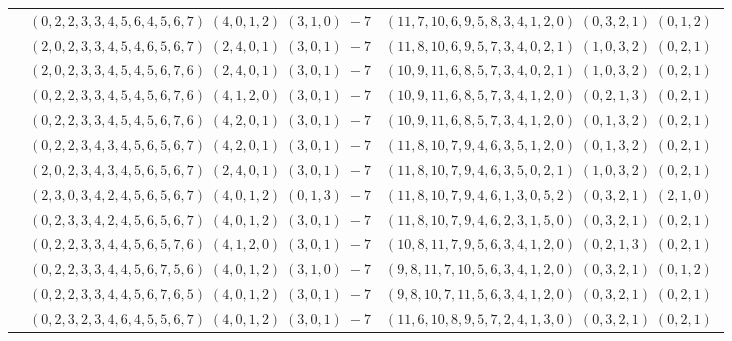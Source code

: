 \documentclass[11pt]{article}
\begin{document}
\begin{longtable}[l]{|c|c|c|}
 \cline{2-3} 
 & $(0 ,2 ,2 ,3 ,3 ,4 ,5 ,6 ,4 ,5 ,6 ,7) \;(4 ,0 ,1 ,2) \;(3 ,1 ,0) \;-7$ & $(11 ,7 ,10 ,6 ,9 ,5 ,8 ,3 ,4 ,1 ,2 ,0) \;(0 ,3 ,2 ,1) \;(0 ,1 ,2) \;$\\ 
 \cline{2-3} 
 & $(2 ,0 ,2 ,3 ,3 ,4 ,5 ,4 ,6 ,5 ,6 ,7) \;(2 ,4 ,0 ,1) \;(3 ,0 ,1) \;-7$ & $(11 ,8 ,10 ,6 ,9 ,5 ,7 ,3 ,4 ,0 ,2 ,1) \;(1 ,0 ,3 ,2) \;(0 ,2 ,1) \;$\\ 
 \cline{2-3} 
 & $(2 ,0 ,2 ,3 ,3 ,4 ,5 ,4 ,5 ,6 ,7 ,6) \;(2 ,4 ,0 ,1) \;(3 ,0 ,1) \;-7$ & $(10 ,9 ,11 ,6 ,8 ,5 ,7 ,3 ,4 ,0 ,2 ,1) \;(1 ,0 ,3 ,2) \;(0 ,2 ,1) \;$\\ 
 \cline{2-3} 
 & $(0 ,2 ,2 ,3 ,3 ,4 ,5 ,4 ,5 ,6 ,7 ,6) \;(4 ,1 ,2 ,0) \;(3 ,0 ,1) \;-7$ & $(10 ,9 ,11 ,6 ,8 ,5 ,7 ,3 ,4 ,1 ,2 ,0) \;(0 ,2 ,1 ,3) \;(0 ,2 ,1) \;$\\ 
 \cline{2-3} 
 & $(0 ,2 ,2 ,3 ,3 ,4 ,5 ,4 ,5 ,6 ,7 ,6) \;(4 ,2 ,0 ,1) \;(3 ,0 ,1) \;-7$ & $(10 ,9 ,11 ,6 ,8 ,5 ,7 ,3 ,4 ,1 ,2 ,0) \;(0 ,1 ,3 ,2) \;(0 ,2 ,1) \;$\\ 
 \cline{2-3} 
 & $(0 ,2 ,2 ,3 ,4 ,3 ,4 ,5 ,6 ,5 ,6 ,7) \;(4 ,2 ,0 ,1) \;(3 ,0 ,1) \;-7$ & $(11 ,8 ,10 ,7 ,9 ,4 ,6 ,3 ,5 ,1 ,2 ,0) \;(0 ,1 ,3 ,2) \;(0 ,2 ,1) \;$\\ 
 \cline{2-3} 
 & $(2 ,0 ,2 ,3 ,4 ,3 ,4 ,5 ,6 ,5 ,6 ,7) \;(2 ,4 ,0 ,1) \;(3 ,0 ,1) \;-7$ & $(11 ,8 ,10 ,7 ,9 ,4 ,6 ,3 ,5 ,0 ,2 ,1) \;(1 ,0 ,3 ,2) \;(0 ,2 ,1) \;$\\ 
 \cline{2-3} 
 & $(2 ,3 ,0 ,3 ,4 ,2 ,4 ,5 ,6 ,5 ,6 ,7) \;(4 ,0 ,1 ,2) \;(0 ,1 ,3) \;-7$ & $(11 ,8 ,10 ,7 ,9 ,4 ,6 ,1 ,3 ,0 ,5 ,2) \;(0 ,3 ,2 ,1) \;(2 ,1 ,0) \;$\\ 
 \cline{2-3} 
 & $(0 ,2 ,3 ,3 ,4 ,2 ,4 ,5 ,6 ,5 ,6 ,7) \;(4 ,0 ,1 ,2) \;(3 ,0 ,1) \;-7$ & $(11 ,8 ,10 ,7 ,9 ,4 ,6 ,2 ,3 ,1 ,5 ,0) \;(0 ,3 ,2 ,1) \;(0 ,2 ,1) \;$\\ 
 \cline{2-3} 
 & $(0 ,2 ,2 ,3 ,3 ,4 ,4 ,5 ,6 ,5 ,7 ,6) \;(4 ,1 ,2 ,0) \;(3 ,0 ,1) \;-7$ & $(10 ,8 ,11 ,7 ,9 ,5 ,6 ,3 ,4 ,1 ,2 ,0) \;(0 ,2 ,1 ,3) \;(0 ,2 ,1) \;$\\ 
 \cline{2-3} 
 & $(0 ,2 ,2 ,3 ,3 ,4 ,4 ,5 ,6 ,7 ,5 ,6) \;(4 ,0 ,1 ,2) \;(3 ,1 ,0) \;-7$ & $(9 ,8 ,11 ,7 ,10 ,5 ,6 ,3 ,4 ,1 ,2 ,0) \;(0 ,3 ,2 ,1) \;(0 ,1 ,2) \;$\\ 
 \cline{2-3} 
 & $(0 ,2 ,2 ,3 ,3 ,4 ,4 ,5 ,6 ,7 ,6 ,5) \;(4 ,0 ,1 ,2) \;(3 ,0 ,1) \;-7$ & $(9 ,8 ,10 ,7 ,11 ,5 ,6 ,3 ,4 ,1 ,2 ,0) \;(0 ,3 ,2 ,1) \;(0 ,2 ,1) \;$\\ 
 \cline{2-3} 
 & $(0 ,2 ,3 ,2 ,3 ,4 ,6 ,4 ,5 ,5 ,6 ,7) \;(4 ,0 ,1 ,2) \;(3 ,0 ,1) \;-7$ & $(11 ,6 ,10 ,8 ,9 ,5 ,7 ,2 ,4 ,1 ,3 ,0) \;(0 ,3 ,2 ,1) \;(0 ,2 ,1) \;$\\ 

\end{longtable}
\end{document}
